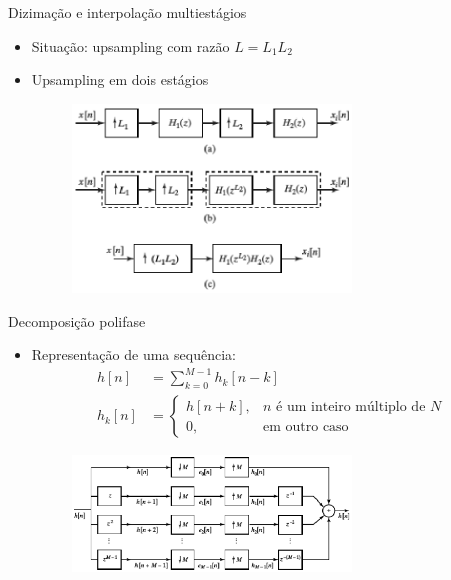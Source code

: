 \documentclass[
size=11pt,
paper=screen,
mode=present,
display=slidesnotes,
style=paintings,
nopagebreaks,
blackslide,
fleqn]{powerdot}
\begin{document}
\begin{slide}{Dizimação e interpolação multiestágios}
	\begin{itemize}
		\item Situação: upsampling com razão $L = L_1L_2$
		\item Upsampling em dois estágios 
			\begin{figure}
				\centering
				\includegraphics[width=0.7\textwidth]{figs/4-34.eps}
			\end{figure}
	\end{itemize}
\end{slide}

\begin{slide}{Decomposição polifase}
	\begin{itemize}
		\item Representação de uma sequência:
			\begin{align*}
				h[n] &= \sum_{k=0}^{M-1} h_k[n-k]\\
				h_k[n] &= \begin{cases} h[n+k], & n \text{ é um inteiro múltiplo de } N\\
					                0, & \text{em outro caso}
					  \end{cases}
			\end{align*}
			\begin{figure}
				\centering
				\includegraphics[width=0.7\textwidth]{figs/4-35.eps}
			\end{figure}
	\end{itemize}
\end{slide}
\end{document}
